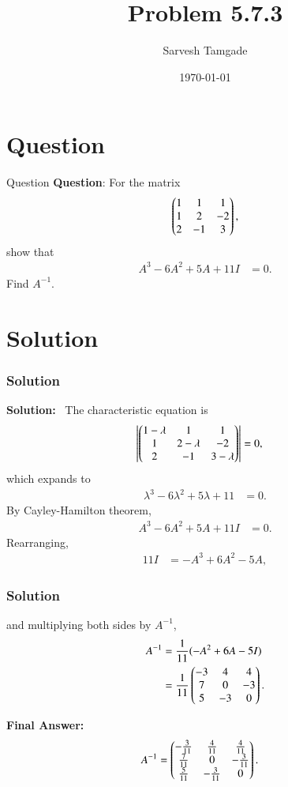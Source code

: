 \documentclass{beamer}
\title{Problem 5.7.3}
\author{Sarvesh Tamgade}
\date{\today}
\numberwithin{equation}{section}
\begin{document}
\begin{frame}
\titlepage
\end{frame}

\section{Question}
\begin{frame}{Question}
\textbf{Question}:
For the matrix
\[
\begin{pmatrix}
1 & 1 & 1 \\
1 & 2 & -2 \\
2 & -1 & 3
\end{pmatrix},
\]
show that
\begin{align}
A^3 - 6A^2 + 5A + 11I &= 0.
\end{align}
Find \(A^{-1}\). 
\end{frame}

\section{Solution}
\begin{frame}[fragile]
    \frametitle{Solution}
\textbf{Solution:} \
The characteristic equation is
\begin{align}
\left|\begin{pmatrix}
1-\lambda & 1 & 1 \\
1 & 2-\lambda & -2 \\
2 & -1 & 3-\lambda
\end{pmatrix} \right| &= 0,
\end{align}
which expands to
\begin{align}
\lambda^3 - 6 \lambda^2 + 5 \lambda + 11 &= 0.
\end{align}
By Cayley-Hamilton theorem,
\begin{align}
A^3 - 6A^2 + 5A + 11I &= 0.
\end{align}
Rearranging,
\begin{align}
11I &= -A^3 + 6A^2 - 5A,
\end{align}

\end{frame}



\begin{frame}[fragile]
    \frametitle{Solution}

and multiplying both sides by \(A^{-1}\),
\begin{align}
A^{-1} &= \frac{1}{11}(-A^2 + 6A - 5I) \\
&= \frac{1}{11} \begin{pmatrix}
-3 & 4 & 4 \\
7 & 0 & -3 \\
5 & -3 & 0
\end{pmatrix}.
\end{align}

\textbf{Final Answer:}
\begin{align}
A^{-1} &= \begin{pmatrix}
-\frac{3}{11} & \frac{4}{11} & \frac{4}{11} \\
\frac{7}{11} & 0 & -\frac{3}{11} \\
\frac{5}{11} & -\frac{3}{11} & 0
\end{pmatrix}.
\end{align}
\end{frame}
\end{document}
